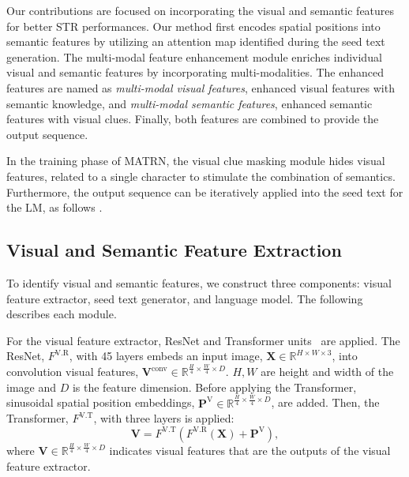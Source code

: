 \documentclass[runningheads]{llncs}
\begin{document}
Our contributions are focused on incorporating the visual and semantic features for better STR performances. Our method first encodes spatial positions into semantic features by utilizing an attention map identified during the seed text generation.
The multi-modal feature enhancement module enriches individual visual and semantic features by incorporating multi-modalities. The enhanced features are named as \textit{multi-modal visual features}, enhanced visual features with semantic knowledge, and \textit{multi-modal semantic features}, enhanced semantic features with visual clues. Finally, both features are combined to provide the output sequence.  

In the training phase of MATRN, the visual clue masking module hides visual features, related to a single character to stimulate the combination of semantics. Furthermore, the output sequence can be iteratively applied into the seed text for the LM, as follows \cite{ABINet}. 

\subsection{Visual and Semantic Feature Extraction}

To identify visual and semantic features, we construct three components: visual feature extractor, seed text generator, and language model. The following describes each module.

For the visual feature extractor, ResNet and Transformer units~\cite{ABINet,Yu_2020_CVPR_SRN} are applied. The ResNet, $F^{\text{V.R}}$, with 45 layers embeds an input image, $\mathbf{X} \in \mathbb{R}^{H \times W \times 3}$, into convolution visual features, $\mathbf{V}^{\text{conv}} \in \mathbb{R}^{\frac{H}{4} \times \frac{W}{4} \times D}$. $H, W$ are height and width of the image and $D$ is the feature dimension. Before applying the Transformer, sinusoidal spatial position embeddings, $\mathbf{P}^{\text{V}}\in \mathbb{R}^{\frac{H}{4} \times \frac{W}{4} \times D}$, are added. Then, the Transformer, $F^{\text{V.T}}$, with three layers is applied:
\begin{equation}
  \mathbf{V} =  F^{\text{V.T}}(F^{\text{V.R}}(\mathbf{X}) + \mathbf{P}^{\text{V}}),  
\end{equation}
where $\mathbf{V} \in \mathbb{R}^{\frac{H}{4} \times \frac{W}{4} \times D}$ indicates visual features that are the outputs of the visual feature extractor.
\end{document}
